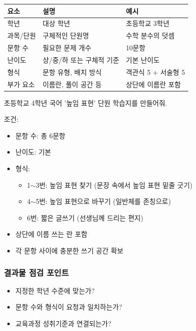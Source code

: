\documentclass[11pt,a4paper]{article}
\begin{document}
\begin{center}
\begin{tabular}{|l|l|l|}
\hline
\rowcolor{lightblue}
\textbf{요소} & \textbf{설명} & \textbf{예시} \\
\hline
학년 & 대상 학년 & 초등학교 3학년 \\
\hline
과목/단원 & 구체적인 단원명 & 수학 분수의 덧셈 \\
\hline
문항 수 & 필요한 문제 개수 & 10문항 \\
\hline
난이도 & 상/중/하 또는 구체적 기준 & 기본 난이도 \\
\hline
형식 & 문항 유형, 배치 방식 & 객관식 5 + 서술형 5 \\
\hline
부가 요소 & 이름란, 풀이 공간 등 & 상단에 이름란 포함 \\
\hline
\end{tabular}
\end{center}

\begin{examplebox}
초등학교 4학년 국어 '높임 표현' 단원 학습지를 만들어줘.

조건:
\begin{itemize}[noitemsep]
  \item 문항 수: 총 6문항
  \item 난이도: 기본
  \item 형식: 
    \begin{itemize}[noitemsep]
      \item 1$\sim$3번: 높임 표현 찾기 (문장 속에서 높임 표현 밑줄 긋기)
      \item 4$\sim$5번: 높임 표현으로 바꾸기 (일반체를 존칭으로)
      \item 6번: 짧은 글쓰기 (선생님께 드리는 편지)
    \end{itemize}
  \item 상단에 이름 쓰는 란 포함
  \item 각 문항 사이에 충분한 쓰기 공간 확보
\end{itemize}
\end{examplebox}

\subsubsection{결과물 점검 포인트}

\begin{itemize}
  \item 지정한 학년 수준에 맞는가?
  \item 문항 수와 형식이 요청과 일치하는가?
  \item 교육과정 성취기준과 연결되는가?
\end{itemize}
\end{document}
